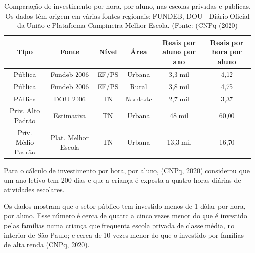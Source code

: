 \begin{table}[htb]
\tiny
\caption{\label{23cb136314ecc87baf0c1a69a07f7ee70c1251f6}Comparação do investimento por hora, por aluno, nas escolas privadas e públicas. Os dados têm origem em várias fontes regionais: FUNDEB, DOU - Diário Oficial da União e Plataforma Campineira Melhor Escola. (Fonte: (CNPq (2020)}

\centering
\begin{tabular}{|c|c|c|c|c|c|}
\hline
Tipo  &  Fonte  &  Nível  &  Área  &  Reais por aluno por ano  &  Reais por hora por aluno \\
\hline
Pública  &  Fundeb 2006  &  EF/PS  &  Urbana  &  3,3 mil  &  4,12 \\
Pública  &  Fundeb 2006  &  EF/PS  &  Rural  &  3,8 mil  &  4,75 \\
Pública  &  DOU 2006  &  TN  &  Nordeste  &  2,7 mil  &  3,37 \\
Priv. Alto Padrão  &  Estimativa  &  TN  &  Urbana  &  48 mil  &  60,00 \\
Priv. Médio Padrão  &  Plat. Melhor Escola  &  TN  &  Urbana  &  13,3 mil  &  16,70 \\
\hline
\end{tabular}
\end{table}


Para o cálculo de investimento por hora, por aluno, (CNPq, 2020) considerou que um ano letivo tem 200 dias e que a criança é exposta a quatro horas diárias de atividades escolares.

Os dados mostram que o setor público tem investido menos de 1 dólar por hora, por aluno. Esse número é cerca de quatro a cinco vezes menor do que é investido pelas famílias numa criança que frequenta escola privada de classe média, no interior de São Paulo; e cerca de 10 vezes menor do que o investido por famílias de alta renda (CNPq, 2020).


\noindent\begin{flushright}\mbox{\linespread{1}\selectfont\centering{}}\end{flushright}


